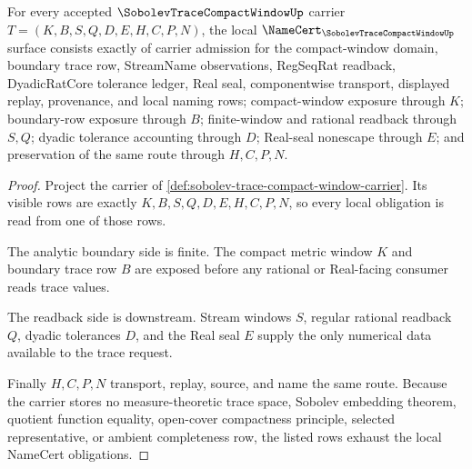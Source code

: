 \begin{theorem}
\label{thm:sobolev-trace-compact-window-namecert-obligations}
For every accepted $\SobolevTraceCompactWindowUp$ carrier $T=(K,B,S,Q,D,E,H,C,P,N)$, the local $\NameCert_{\SobolevTraceCompactWindowUp}$ surface consists exactly of carrier admission for the compact-window domain, boundary trace row, StreamName observations, RegSeqRat readback, DyadicRatCore tolerance ledger, Real seal, componentwise transport, displayed replay, provenance, and local naming rows; compact-window exposure through $K$; boundary-row exposure through $B$; finite-window and rational readback through $S,Q$; dyadic tolerance accounting through $D$; Real-seal nonescape through $E$; and preservation of the same route through $H,C,P,N$.
\end{theorem}
\begin{proof}
Project the carrier of \autoref{def:sobolev-trace-compact-window-carrier}. Its visible rows are exactly $K,B,S,Q,D,E,H,C,P,N$, so every local obligation is read from one of those rows.

The analytic boundary side is finite. The compact metric window $K$ and boundary trace row $B$ are exposed before any rational or Real-facing consumer reads trace values.

The readback side is downstream. Stream windows $S$, regular rational readback $Q$, dyadic tolerances $D$, and the Real seal $E$ supply the only numerical data available to the trace request.

Finally $H,C,P,N$ transport, replay, source, and name the same route. Because the carrier stores no measure-theoretic trace space, Sobolev embedding theorem, quotient function equality, open-cover compactness principle, selected representative, or ambient completeness row, the listed rows exhaust the local NameCert obligations.
\end{proof}

